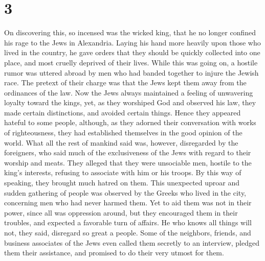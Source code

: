 \hypertarget{section-2}{%
\section{3}\label{section-2}}

 On discovering this, so incensed was the wicked king, that
he no longer confined his rage to the Jews in Alexandria. Laying his
hand more heavily upon those who lived in the country, he gave orders
that they should be quickly collected into one place, and most cruelly
deprived of their lives.  While this was going on, a hostile
rumor was uttered abroad by men who had banded together to injure the
Jewish race. The pretext of their charge was that the Jews kept them
away from the ordinances of the law.  Now the Jews always
maintained a feeling of unwavering loyalty toward the kings,
 yet, as they worshiped God and observed his law, they made
certain distinctions, and avoided certain things. Hence they appeared
hateful to some people,  although, as they adorned their
conversation with works of righteousness, they had established
themselves in the good opinion of the world.  What all the
rest of mankind said was, however, disregarded by the foreigners,
 who said much of the exclusiveness of the Jews with regard
to their worship and meats. They alleged that they were unsociable men,
hostile to the king's interests, refusing to associate with him or his
troops. By this way of speaking, they brought much hatred on them.
 This unexpected uproar and sudden gathering of people was
observed by the Greeks who lived in the city, concerning men who had
never harmed them. Yet to aid them was not in their power, since all was
oppression around, but they encouraged them in their troubles, and
expected a favorable turn of affairs.  He who knows all
things will not, they said, disregard so great a people. 
Some of the neighbors, friends, and business associates of the Jews even
called them secretly to an interview, pledged them their assistance, and
promised to do their very utmost for them.

